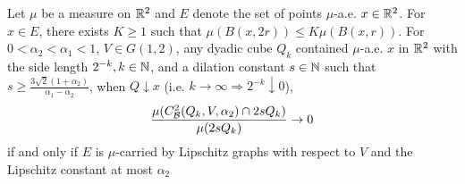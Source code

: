 \begin{lemma}
    Let $\mu$ be a measure on $\mathbb{R}^2$ and $E$ denote the set of points $\mu$-a.e. $x\in\mathbb{R}^2$. For $x\in E$, there exists $K\geq 1$ such that $\mu(B(x, 2r))\leq K\mu(B(x,r))$. For $0<\alpha_2<\alpha_1<1$, $V\in G(1,2)$, any dyadic cube $Q_k$ contained $\mu$-a.e. $x$ in $\mathbb{R}^2$ with the side length $2^{-k}, k\in\mathbb{N}$, and a dilation constant $s\in\mathbb{N}$ such that $s \geq \frac{3\sqrt{2}(1+\alpha_2)}{\alpha_1-\alpha_2}$, when $Q\downarrow x$ (i.e. $k\rightarrow\infty \Rightarrow 2^{-k}\downarrow 0$),
    \begin{equation}
        \frac{\mu(C_\mathcal B^{2}(Q_k, V, \alpha_2)\cap 2sQ_k)}{\mu(2sQ_k)} \rightarrow 0
    \end{equation}
    if and only if $E$ is $\mu$-carried by Lipschitz graphs with respect to $V$ and the Lipschitz constant at most $\alpha_2$
\end{lemma}
